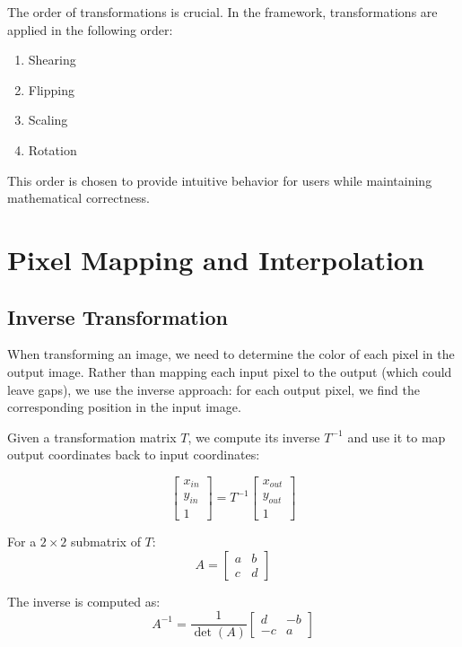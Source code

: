 \documentclass{article}
\begin{document}
The order of transformations is crucial. In the framework, transformations are applied in the following order:
\begin{enumerate}
    \item Shearing
    \item Flipping
    \item Scaling
    \item Rotation
\end{enumerate}

This order is chosen to provide intuitive behavior for users while maintaining mathematical correctness.

\section{Pixel Mapping and Interpolation}

\subsection{Inverse Transformation}

When transforming an image, we need to determine the color of each pixel in the output image. Rather than mapping each input pixel to the output (which could leave gaps), we use the inverse approach: for each output pixel, we find the corresponding position in the input image.

Given a transformation matrix $T$, we compute its inverse $T^{-1}$ and use it to map output coordinates back to input coordinates:

\begin{equation}
\begin{bmatrix}
x_{in} \\
y_{in} \\
1
\end{bmatrix} = 
T^{-1}
\begin{bmatrix}
x_{out} \\
y_{out} \\
1
\end{bmatrix}
\end{equation}

For a $2 \times 2$ submatrix of $T$:
\begin{equation}
A = \begin{bmatrix}
a & b \\
c & d
\end{bmatrix}
\end{equation}

The inverse is computed as:
\begin{equation}
A^{-1} = \frac{1}{\det(A)} \begin{bmatrix}
d & -b \\
-c & a
\end{bmatrix}
\end{equation}
\end{document}
